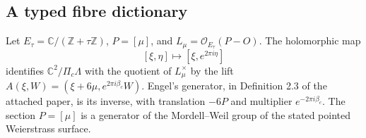 \subsection{A typed fibre dictionary}\label{fam:section:B.1}

\begin{proposition}\label{fam:src:B.1.1}\label{fam:st:B.1.1}
Let $E_\tau=\mathbb C/(\mathbb Z+\tau\mathbb Z)$, $P=[\mu]$, and $L_\mu=\mathcal O_{E_\tau}(P-O)$. The holomorphic map
\[
 [\xi,\eta]\longmapsto[\xi,e^{2\pi i\eta}]
\]
identifies $\mathbb C^2/\Pi_c\Lambda$ with the quotient of $L_\mu^\times$ by the lift
$A(\xi,W)=(\xi+6\mu,e^{2\pi i\beta_c}W)$. Engel's generator, in Definition 2.3 of the attached paper, is its inverse, with translation $-6P$ and multiplier $e^{-2\pi i\beta_c}$. The section $P=[\mu]$ is a generator of the Mordell--Weil group of the stated pointed Weierstrass surface.
\end{proposition}

